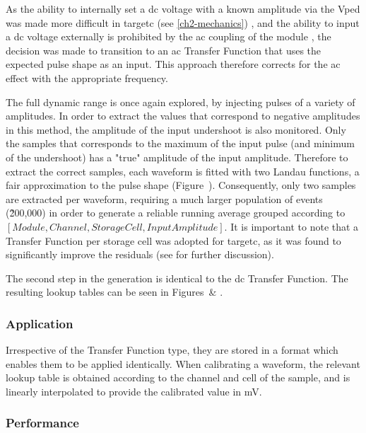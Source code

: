 As the ability to internally set a \gls{dc} voltage with a known amplitude via the Vped was made more difficult in \gls{targetc} (see \ref{ch2-mechanics}) , and the ability to input a \gls{dc} voltage externally is prohibited by the \gls{ac} coupling of the module , the decision was made to transition to an \gls{ac} Transfer Function that uses the expected pulse shape as an input. This approach therefore corrects for the \gls{ac} effect with the appropriate frequency. 
	
The full dynamic range is once again explored, by injecting pulses of a variety of amplitudes. In order to extract the values that correspond to negative amplitudes in this method, the amplitude of the input undershoot is also monitored. Only the samples that corresponds to the maximum of the input pulse (and minimum of the undershoot) has a "true" amplitude of the input amplitude. Therefore to extract the correct samples, each waveform is fitted with two Landau functions, a fair approximation to the pulse shape (Figure~). Consequently, only two samples are extracted per waveform, requiring a much larger population of events (\~200,000) in order to generate a reliable running average grouped according to $[Module, Channel, Storage Cell, Input Amplitude]$. It is important to note that a Transfer Function per storage cell was adopted for \gls{targetc}, as it was found to significantly improve the residuals (see  for further discussion).

The second step in the generation is identical to the \gls{dc} Transfer Function. The resulting lookup tables can be seen in Figures~\& .

\subsubsection{Application}

Irrespective of the Transfer Function type, they are stored in a format which enables them to be applied identically. When calibrating a waveform, the relevant lookup table is obtained according to the channel and cell of the sample, and is linearly interpolated to provide the calibrated value in mV.

\subsubsection{Performance}

